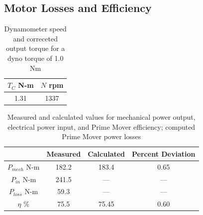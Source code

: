 \documentclass{article}
\begin{document}
\subsection{Motor Losses and Efficiency}

\begin{table}[H]
  \centering
  \begin{tabular}{*{2}{c}}
    $T_{C}$ N-m& $N$ rpm \\
    \hline
    1.31 & 1337  \\
  \end{tabular}
  \caption{Dynamometer speed and correceted output torque for a dyno torque of 1.0 Nm}
  \label{tab:table_04}
\end{table}

\begin{table}[H]
  \centering
  \begin{tabular}{*{4}{c}}
    & Measured & Calculated & Percent Deviation \\
    \hline
    $P_{mech}$ N-m & 182.2 & 183.4  & 0.65  \\
    $P_{in}$ N-m & 241.5 & --- & --- \\
    $P_{loss}$ N-m & 59.3 & --- & --- \\
    $\eta$ \% & 75.5 & 75.45 & 0.60 \\
  \end{tabular}
  \caption{Measured and calculated values for mechanical power output,
  electrical power input, and Prime Mover efficiency; computed Prime Mover
  power losses}
  \label{tab:table_05}
\end{table}
\end{document}
